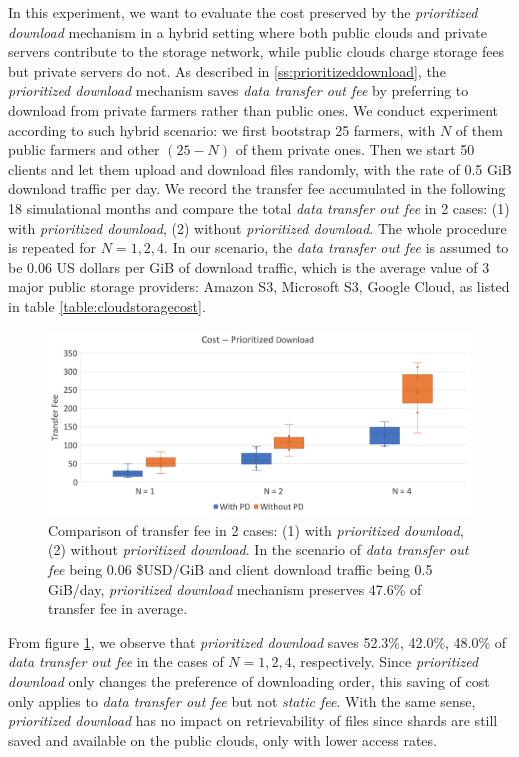 In this experiment, we want to evaluate the cost preserved by the \textit{prioritized download} mechanism in a hybrid setting where both public clouds and private servers contribute to the storage network, while public clouds charge storage fees but private servers do not. As described in \ref{ss:prioritizeddownload}, the \textit{prioritized download} mechanism saves \textit{data transfer out fee} by preferring to download from private farmers rather than public ones. We conduct experiment according to such hybrid scenario: we first bootstrap 25 farmers, with $N$ of them public farmers and other $(25-N)$ of them private ones.  Then we start 50 clients and let them upload and download files randomly, with the rate of 0.5 GiB download traffic per day. We record the transfer fee accumulated in the following 18 simulational months and compare the total \textit{data transfer out fee} in 2 cases: (1) with \textit{prioritized download}, (2) without \textit{prioritized download}. The whole procedure is repeated for $N = 1, 2, 4$. In our scenario, the \textit{data transfer out fee} is assumed to be 0.06 US dollars per GiB of download traffic, which is the average value of 3 major public storage providers: Amazon S3, Microsoft S3, Google Cloud, as listed in table \ref{table:cloudstoragecost}.

\begin{figure}[hbt]
  \centering
    \includegraphics[width=14cm]{charts/chart_cost_prioritized_download.png}
    \caption[Comparison of transfer fee in 2 cases: (1) with \textit{prioritized download}, (2) without \textit{prioritized download}]{Comparison of transfer fee in 2 cases: (1) with \textit{prioritized download}, (2) without \textit{prioritized download}. In the scenario of \textit{data transfer out fee} being 0.06 \$USD/GiB and client download traffic being 0.5 GiB/day, \textit{prioritized download} mechanism preserves 47.6\% of transfer fee in average.}
    \label{fig:costprioritizeddownload}
\end{figure}

From figure \ref{fig:costprioritizeddownload}, we observe that \textit{prioritized download} saves 52.3\%, 42.0\%, 48.0\% of \textit{data transfer out fee} in the cases of $N = 1, 2, 4$, respectively. Since \textit{prioritized download} only changes the preference of downloading order, this saving of cost only applies to \textit{data transfer out fee} but not \textit{static fee}. With the same sense, \textit{prioritized download} has no impact on retrievability of files since shards are still saved and available on the public clouds, only with lower access rates.



  